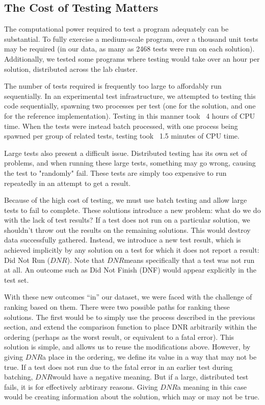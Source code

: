 \documentclass[11pt,twoside]{article}
\newcommand\dnr{\ensuremath{\mathit{DNR}}}
\theoremstyle{definition}
\begin{document}
\subsection{The Cost of Testing Matters}

The computational power required to test a program adequately can be substantial. To fully exercise a medium-scale program, over a thousand unit tests may be required (in our data, as many as 2468 tests were run on each solution). Additionally, we tested some programs where testing would take over an hour per solution, distributed across the lab cluster.

The number of tests required is frequently too large to affordably run sequentially. In an experimental test infrastructure, we attempted to testing this code sequentially, spawning two processes per test (one for the solution, and one for the reference implementation). Testing in this manner took ~4 hours of CPU time. When the tests were instead batch processed, with one process being spawned per group of related tests, testing took ~1.5 minutes of CPU time.

Large tests also present a difficult issue. Distributed testing has its own set of problems, and when running these large tests, something may go wrong, causing the test to "randomly" fail. These tests are simply too expensive to run repeatedly in an attempt to get a result.

Because of the high cost of testing, we must use batch testing and allow large tests to fail to complete. These solutions introduce a new problem: what do we do with the lack of test results? If a test does not run on a particular solution, we shouldn't throw out the results on the remaining solutions. This would destroy data successfully gathered. Instead, we introduce a new test result, which is achieved implicitly by any solution on a test for which it does not report a result: Did Not Run (\dnr). Note that \dnr means specifically that a test was not run at all. An outcome such as Did Not Finish (DNF) would appear explicitly in the test set.

With these new outcomes ``in'' our dataset, we were faced with the challenge of ranking based on them. There were two possible paths for ranking these solutions. The first would be to simply use the process described in the previous section, and extend the comparison function to place DNR arbitrarily within the ordering (perhaps as the worst result, or equivalent to a fatal error). This solution is simple, and allows us to reuse the modifications above. However, by giving \dnr a place in the ordering, we define its value in a way that may not be true. If a test does not run due to the fatal error in an earlier test during batching, \dnr would have a negative meaning. But if a large, distributed test fails, it is for effectively arbtirary reasons. Giving \dnr a meaning in this case would be creating information about the solution, which may or may not be true.
\end{document}
